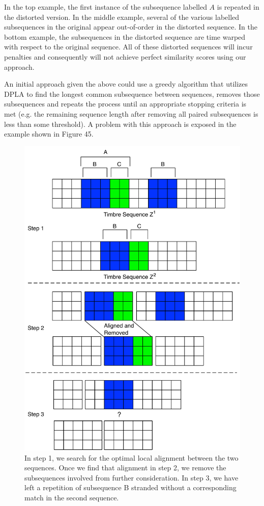 \documentclass[12pt]{report} 	%
\numberwithin{figure}{chapter}
\numberwithin{table}{chapter}
\numberwithin{equation}{chapter}
\begin{document}
\begin{flushleft}
In the top example, the first instance of the subsequence labelled $A$ is repeated in the distorted version. In the middle example, several of the various labelled subsequences in the original appear out-of-order in the distorted sequence. In the bottom example, the subsequences  in the distorted sequence are time warped with respect to the original sequence. All of these distorted sequences will incur penalties and consequently will not achieve perfect similarity scores using our approach.

An initial approach given the above could use a greedy algorithm that utilizes DPLA to find the longest common subsequence between sequences, removes those subsequences and repeats the process until an appropriate stopping criteria is met (e.g. the remaining sequence length after removing all paired subsequences is less than some threshold). A problem with this approach is exposed in the example shown in Figure 45. 
\begin{figure}[!p]
\begin{center}
\includegraphics[scale=0.6]{GreedyMatching1}
\caption[Symmetric greedy removal after matching]{In step 1, we search for the optimal local alignment between the two sequences. Once we find that alignment in step 2, we remove the subsequences involved from further consideration. In step 3, we have left a repetition of subsequence B stranded without a corresponding match in the second sequence.}
\end{center}
\end{figure}


\end{flushleft}
\end{document}
